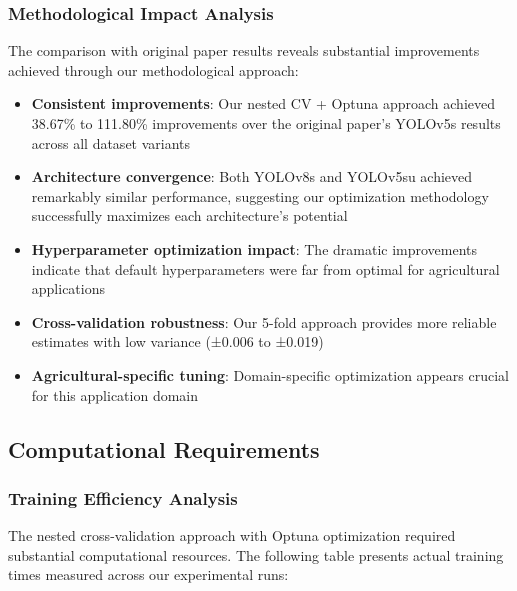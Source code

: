 \subsubsection{Methodological Impact Analysis}

The comparison with original paper results reveals substantial improvements achieved through our methodological approach:

\begin{itemize}
    \item \textbf{Consistent improvements}: Our nested CV + Optuna approach achieved 38.67\% to 111.80\% improvements over the original paper's YOLOv5s results across all dataset variants
    \item \textbf{Architecture convergence}: Both YOLOv8s and YOLOv5su achieved remarkably similar performance, suggesting our optimization methodology successfully maximizes each architecture's potential
    \item \textbf{Hyperparameter optimization impact}: The dramatic improvements indicate that default hyperparameters were far from optimal for agricultural applications
    \item \textbf{Cross-validation robustness}: Our 5-fold approach provides more reliable estimates with low variance (±0.006 to ±0.019)
    \item \textbf{Agricultural-specific tuning}: Domain-specific optimization appears crucial for this application domain
\end{itemize}

\subsection{Computational Requirements}

\subsubsection{Training Efficiency Analysis}

The nested cross-validation approach with Optuna optimization required substantial computational resources. The following table presents actual training times measured across our experimental runs:

